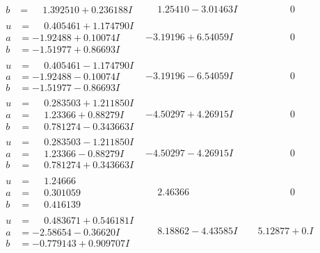 \documentclass[1p]{elsarticle_modified}
\theoremstyle{definition}
\begin{document}
$$\begin{array}{c|c|c}
\begin{aligned}
b &= \phantom{-}1.392510 + 0.236188 I\end{aligned}
 & \phantom{-}1.25410 - 3.01463 I & \phantom{-0.000000 } 0 \\ \hline\begin{aligned}
u &= \phantom{-}0.405461 + 1.174790 I \\
a &= -1.92488 + 0.10074 I \\
b &= -1.51977 + 0.86693 I\end{aligned}
 & -3.19196 + 6.54059 I & \phantom{-0.000000 } 0 \\ \hline\begin{aligned}
u &= \phantom{-}0.405461 - 1.174790 I \\
a &= -1.92488 - 0.10074 I \\
b &= -1.51977 - 0.86693 I\end{aligned}
 & -3.19196 - 6.54059 I & \phantom{-0.000000 } 0 \\ \hline\begin{aligned}
u &= \phantom{-}0.283503 + 1.211850 I \\
a &= \phantom{-}1.23366 + 0.88279 I \\
b &= \phantom{-}0.781274 - 0.343663 I\end{aligned}
 & -4.50297 + 4.26915 I & \phantom{-0.000000 } 0 \\ \hline\begin{aligned}
u &= \phantom{-}0.283503 - 1.211850 I \\
a &= \phantom{-}1.23366 - 0.88279 I \\
b &= \phantom{-}0.781274 + 0.343663 I\end{aligned}
 & -4.50297 - 4.26915 I & \phantom{-0.000000 } 0 \\ \hline\begin{aligned}
u &= \phantom{-}1.24666\phantom{ +0.000000I} \\
a &= \phantom{-}0.301059\phantom{ +0.000000I} \\
b &= \phantom{-}0.416139\phantom{ +0.000000I}\end{aligned}
 & \phantom{-}2.46366\phantom{ +0.000000I} & \phantom{-0.000000 } 0 \\ \hline\begin{aligned}
u &= \phantom{-}0.483671 + 0.546181 I \\
a &= -2.58654 - 0.36620 I \\
b &= -0.779143 + 0.909707 I\end{aligned}
 & \phantom{-}8.18862 - 4.43585 I & \phantom{-}5.12877 + 0. I\phantom{ +0.000000I}\\

\end{array}$$
\end{document}
